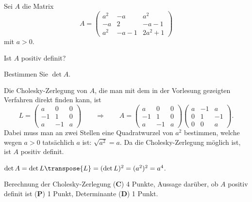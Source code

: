 %
Sei $A$ die Matrix
\[
A
=
\begin{pmatrix}
a^2     &   -a    &   a^2    \\
-a      &    2    & -a-1     \\
a^2     &  -a-1   & 2a^2 + 1
\end{pmatrix}
\]
mit $a>0$.
\begin{teilaufgaben}
\item
Ist $A$ positiv definit?
\item
Bestimmen Sie $\det A$.
\end{teilaufgaben}


\begin{loesung}
\begin{teilaufgaben}
\item
Die Cholesky-Zerlegung von $A$, die man mit dem in der Vorlesung
gezeigten Verfahren direkt finden kann, ist
\[
L=
\begin{pmatrix}
 a& 0& 0\\
-1& 1& 0\\
 a&-1& a
\end{pmatrix}
\qquad\Rightarrow\qquad
A
=
\begin{pmatrix}
 a& 0& 0\\
-1& 1& 0\\
 a&-1& a
\end{pmatrix}
\begin{pmatrix}
 a&-1& a\\
 0& 1&-1\\
 0& 0& a
\end{pmatrix}.
\]
Dabei muss man an zwei Stellen eine Quadratwurzel von $a^2$ bestimmen,
welche wegen $a>0$ tatsächlich $a$ ist: $\sqrt{a^2}=a$.
Da die Cholesky-Zerlegung möglich ist, ist $A$ positiv definit.
\item
$\det A = \det L\transpose{L} =(\det L)^2 = (a^2)^2 = a^4$.
\qedhere
\end{teilaufgaben}
\end{loesung}

\begin{bewertung}
Berechnung der Cholesky-Zerlegung ({\bf C}) 4 Punkte,
Aussage darüber, ob $A$ positiv definit ist ({\bf P}) 1 Punkt,
Determinante ({\bf D}) 1 Punkt.
\end{bewertung}
